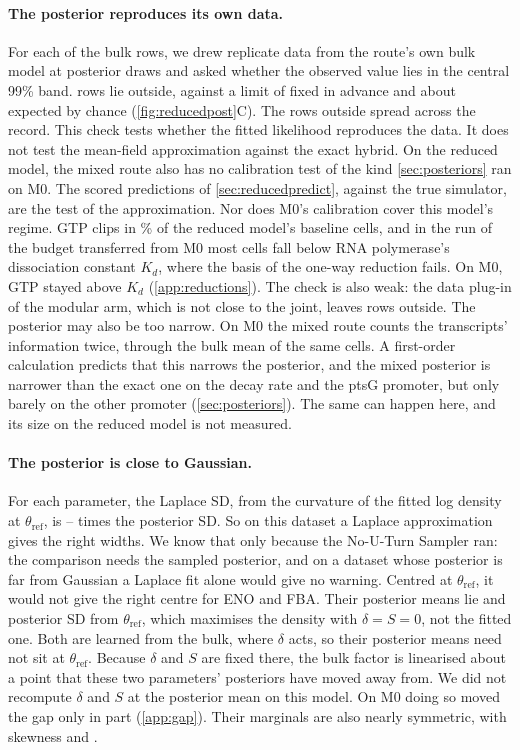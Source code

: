 \paragraph{The posterior reproduces its own data.} For each of the 
bulk rows, we drew replicate data from the route's own bulk model at posterior draws and
asked whether the observed value lies in the central 99\% band.  rows
lie outside, against a limit of  fixed in advance and about
 expected by chance (\cref{fig:reducedpost}C). The rows outside
spread across the record. This check tests whether the fitted likelihood reproduces the
data. It does not test the mean-field approximation against the exact hybrid. On the
reduced model, the mixed route also has no calibration test of the kind
\cref{sec:posteriors} ran on M0. The scored predictions of \cref{sec:reducedpredict},
against the true simulator, are the test of the approximation. Nor does M0's calibration cover
this model's regime. GTP clips in \% of the reduced model's baseline cells, and
in the run of the budget transferred from M0 most cells fall below RNA polymerase's dissociation constant
$K_d$, where the basis of the one-way reduction fails. On M0, GTP stayed above $K_d$
(\cref{app:reductions}). The check is also weak: the data plug-in of the
modular arm, which is not close to the joint, leaves  rows outside. The
posterior may also be too narrow. On M0 the mixed route counts the transcripts' information twice,
through the bulk mean of the same cells. A first-order calculation predicts that this narrows the
posterior, and the mixed posterior is narrower than the exact one on the decay rate and the ptsG
promoter, but only barely on the other promoter (\cref{sec:posteriors}).
The same can happen here, and its size on the reduced model is not measured.

\paragraph{The posterior is close to Gaussian.} For each parameter, the Laplace SD, from the
curvature of the fitted log density at $\theta_{\mathrm{ref}}$, is
-- times the posterior SD. So on this dataset a Laplace
approximation gives the right widths. We know that only because the No-U-Turn Sampler ran: the comparison
needs the sampled posterior, and on a dataset whose posterior is far from Gaussian a Laplace
fit alone would give no warning. Centred at $\theta_{\mathrm{ref}}$, it would not give the
right centre for ENO and FBA. Their posterior means lie  and  posterior SD from
$\theta_{\mathrm{ref}}$, which maximises the density with $\delta = S = 0$, not the fitted one.
Both are learned from the bulk, where $\delta$ acts, so their posterior means need not sit
at $\theta_{\mathrm{ref}}$. Because $\delta$ and $S$ are fixed there, the bulk factor is
linearised about a point that these two parameters' posteriors have moved away from. We did not
recompute $\delta$ and $S$ at the posterior mean on this model. On M0 doing so moved the gap
only in part (\cref{app:gap}).
Their marginals are also nearly symmetric, with skewness  and
.

